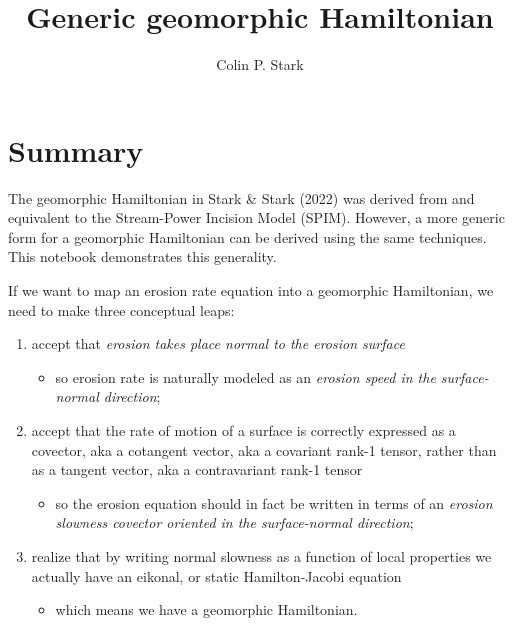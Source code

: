 \documentclass[11pt]{article}
\title{Generic geomorphic Hamiltonian}
\author{Colin P. Stark}
\providecommand{\tightlist}{%
      \setlength{\itemsep}{0pt}\setlength{\parskip}{0pt}}
\begin{document}
    
    \maketitle
    
    

    
    \hypertarget{summary}{%
\section*{Summary}\label{summary}}

    The geomorphic Hamiltonian in Stark \& Stark (2022) was derived from and
equivalent to the Stream-Power Incision Model (SPIM). However, a more
generic form for a geomorphic Hamiltonian can be derived using the same
techniques. This notebook demonstrates this generality.

    If we want to map an erosion rate equation into a geomorphic
Hamiltonian, we need to make three conceptual leaps:

\begin{enumerate}
\def\labelenumi{\arabic{enumi}.}
\tightlist
\item
  accept that \emph{erosion takes place normal to the erosion surface}

  \begin{itemize}
  \tightlist
  \item
    so erosion rate is naturally modeled as an \emph{erosion speed in
    the surface-normal direction};
  \end{itemize}
\item
  accept that the rate of motion of a surface is correctly expressed as
  a covector, aka a cotangent vector, aka a covariant rank-1 tensor,
  rather than as a tangent vector, aka a contravariant rank-1 tensor

  \begin{itemize}
  \tightlist
  \item
    so the erosion equation should in fact be written in terms of an
    \emph{erosion slowness covector oriented in the surface-normal
    direction};
  \end{itemize}
\item
  realize that by writing normal slowness as a function of local
  properties we actually have an eikonal, or static Hamilton-Jacobi
  equation

  \begin{itemize}
  \tightlist
  \item
    which means we have a geomorphic Hamiltonian.
  \end{itemize}
\end{enumerate}
\end{document}
